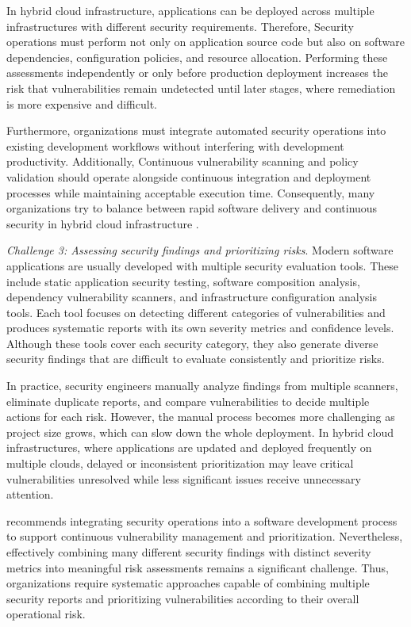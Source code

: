 In hybrid cloud infrastructure, applications can be deployed across multiple infrastructures with different security requirements. Therefore, Security operations must perform not only on application source code but also on software dependencies, configuration policies, and resource allocation. Performing these assessments independently or only before production deployment increases the risk that vulnerabilities remain undetected until later stages, where remediation is more expensive and difficult.

Furthermore, organizations must integrate automated security operations into existing development workflows without interfering with development productivity. Additionally, Continuous vulnerability scanning and policy validation should operate alongside continuous integration and deployment processes while maintaining acceptable execution time. Consequently, many organizations try to balance between rapid software delivery and continuous security in hybrid cloud infrastructure \cite{NISTSSDF2022}.

\vspace{0.3cm}

\textit{Challenge 3: Assessing security findings and prioritizing risks}.
Modern software applications are usually developed with multiple security evaluation tools. These include static application security testing, software composition analysis, dependency vulnerability scanners, and infrastructure configuration analysis tools. Each tool focuses on detecting different categories of vulnerabilities and produces systematic reports with its own severity metrics and confidence levels. Although these tools cover each security category, they also generate diverse security findings that are difficult to evaluate consistently and prioritize risks.

In practice, security engineers manually analyze findings from multiple scanners, eliminate duplicate reports, and compare vulnerabilities to decide multiple actions for each risk. However, the manual process becomes more challenging as project size grows, which can slow down the whole deployment. In hybrid cloud infrastructures, where applications are updated and deployed frequently on multiple clouds, delayed or inconsistent prioritization may leave critical vulnerabilities unresolved while less significant issues receive unnecessary attention.

\cite{NISTSSDF2022} recommends integrating security operations into a software development process to support continuous vulnerability management and prioritization. Nevertheless, effectively combining many different security findings with distinct severity metrics into meaningful risk assessments remains a significant challenge. Thus, organizations require systematic approaches capable of combining multiple security reports and prioritizing vulnerabilities according to their overall operational risk.

